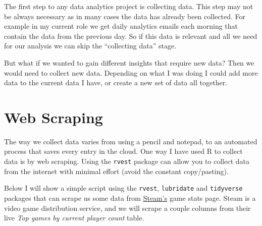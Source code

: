 \documentclass[
  letterpaper,
  DIV=11,
  numbers=noendperiod]{scrreprt}
\begin{document}
The first step to any data analytics project is collecting data. This
step may not be always necessary as in many cases the data has already
been collected. For example in my current role we get daily analytics
emails each morning that contain the data from the previous day. So if
this data is relevant and all we need for our analysis we can skip the
``collecting data'' stage.

But what if we wanted to gain different insights that require new data?
Then we would need to collect new data. Depending on what I was doing I
could add more data to the current data I have, or create a new set of
data all together.

\hypertarget{web-scraping}{%
\section{\texorpdfstring{\textbf{Web
Scraping}}{Web Scraping}}\label{web-scraping}}

The way we collect data varies from using a pencil and notepad, to an
automated process that saves every entry in the cloud. One way I have
used R to collect data is by web scraping. Using the \texttt{rvest}
package can allow you to collect data from the internet with minimal
effort (avoid the constant copy/pasting).

Below I will show a simple script using the \texttt{rvest},
\texttt{lubridate} and \texttt{tidyverse} packages that can scrape us
some data from \href{https://store.steampowered.com/stats/}{Steam's}
game stats page. Steam is a video game distribution service, and we will
scrape a couple columns from their live \emph{Top games by current
player count} table.
\end{document}
